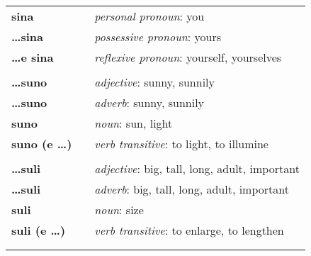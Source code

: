 \begin{supertabular}{p{2,5cm}|ll}
    \textbf{sina}           &  & \textit{personal pronoun}: you                                                                          \\
    \textbf{\dots sina}     &  & \textit{possessive pronoun}: yours                                                                      \\
    \textbf{\dots e sina}   &  & \textit{reflexive pronoun}: yourself, yourselves                                                        \\
                            &  &                                                                                                         \\
    \textbf{\dots suno}     &  & \textit{adjective}: sunny, sunnily                                                                      \\
    \textbf{\dots suno}     &  & \textit{adverb}: sunny, sunnily                                                                         \\
    \textbf{suno}           &  & \textit{noun}: sun, light                                                                               \\
    \textbf{suno (e \dots)} &  & \textit{verb transitive}: to light, to illumine                                                         \\
                            &  &                                                                                                         \\
    \textbf{\dots suli}     &  & \textit{adjective}: big, tall, long, adult, important                                                   \\
    \textbf{\dots suli}     &  & \textit{adverb}: big, tall, long, adult, important                                                      \\
    \textbf{suli}           &  & \textit{noun}: size                                                                                     \\
    \textbf{suli (e \dots)} &  & \textit{verb transitive}: to enlarge, to lengthen                                                       \\
                            &  &                                                                                                         \\

\end{supertabular}
